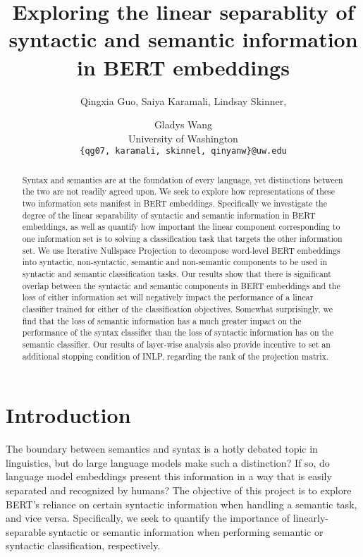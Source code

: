 \documentclass[11pt,a4paper]{article}
\title{Exploring the linear separablity of syntactic and semantic information in BERT embeddings }
\author{Qingxia Guo, Saiya Karamali, Lindsay Skinner, \and Gladys Wang
 \\ University of Washington \\ 
\texttt{\{qg07, karamali, skinnel, qinyanw\}@uw.edu}\\ 
}
\date{}
\begin{document}
\maketitle

\begin{abstract}
Syntax and semantics are at the foundation of every language, yet distinctions between the two are not readily agreed upon. We seek to explore how representations of these two information sets manifest in BERT embeddings. Specifically we investigate the degree of the linear separability of syntactic and semantic information in BERT embeddings, as well as quantify how important the linear component corresponding to one information set is to solving a classification task that targets the other information set. We use Iterative Nullspace Projection to decompose word-level BERT embeddings into syntactic, non-syntactic, semantic and non-semantic components to be used in syntactic and semantic classification tasks. Our results show that there is significant overlap between the syntactic and semantic components in BERT embeddings and the loss of either information set will negatively impact the performance of a linear classifier trained for either of the classification objectives. Somewhat surprisingly, we find that the loss of semantic information has a much greater impact on the performance of the syntax classifier than the loss of syntactic information has on the semantic classifier. Our results of layer-wise analysis also provide incentive to set an additional stopping condition of INLP, regarding the rank of the projection matrix.
\end{abstract}



\section{Introduction}
\label{sec:introduction}


The boundary between semantics and syntax is a hotly debated topic in linguistics, but do large language models make such a distinction? If so, do language model embeddings present this information in a way that is easily separated and recognized by humans? The objective of this project is to explore BERT\rq s \citep{bert} reliance on certain syntactic information when handling a semantic task, and vice versa. Specifically, we seek to quantify the importance of linearly-separable syntactic or semantic information when performing semantic or syntactic classification, respectively. 
\end{document}
